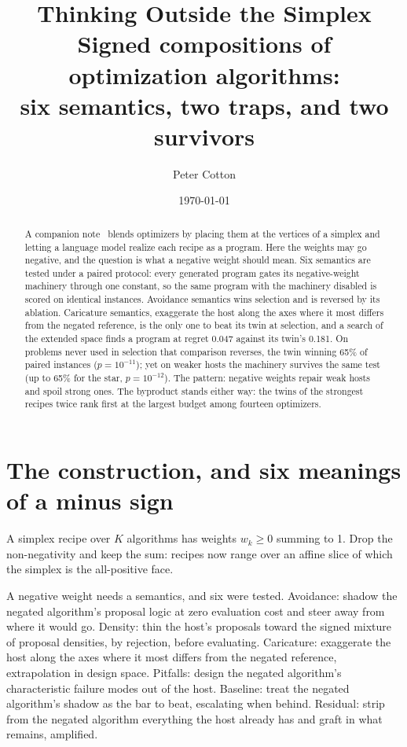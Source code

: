 \documentclass[11pt]{article}
\title{Thinking Outside the Simplex\\[0.4em]
\large Signed compositions of optimization algorithms:\\
six semantics, two traps, and two survivors}
\author{Peter Cotton}
\date{\today}
\begin{document}
\maketitle

\begin{abstract}
\noindent A companion note~\cite{alloy2026} blends optimizers by placing
them at the vertices of a simplex and letting a language model realize each
recipe as a program. Here the weights may go negative, and the question is
what a negative weight should mean. Six semantics are tested under a paired
protocol: every generated program gates its negative-weight machinery
through one constant, so the same program with the machinery disabled is
scored on identical instances. Avoidance semantics wins selection and is
reversed by its ablation. Caricature semantics, exaggerate the host along
the axes where it most differs from the negated reference, is the only one
to beat its twin at selection, and a search of the extended space finds a
program at regret 0.047 against its twin's 0.181. On problems never used in
selection that comparison reverses, the twin winning 65\% of paired
instances ($p = 10^{-11}$); yet on weaker hosts the machinery survives the
same test (up to 65\% for the star, $p = 10^{-12}$). The pattern: negative
weights repair weak hosts and spoil strong ones. The byproduct stands
either way: the twins of the strongest recipes twice rank first at the
largest budget among fourteen optimizers.
\end{abstract}

\section{The construction, and six meanings of a minus sign}

A simplex recipe over $K$ algorithms has weights $w_k \ge 0$ summing to 1.
Drop the non-negativity and keep the sum: recipes now range over an affine
slice of which the simplex is the all-positive face.

A negative weight needs a semantics, and six were tested. Avoidance: shadow
the negated algorithm's proposal logic at zero evaluation cost and steer
away from where it would go. Density: thin the host's proposals toward the
signed mixture of proposal densities, by rejection, before evaluating.
Caricature: exaggerate the host along the axes where it most differs from
the negated reference, extrapolation in design space. Pitfalls: design the
negated algorithm's characteristic failure modes out of the host. Baseline:
treat the negated algorithm's shadow as the bar to beat, escalating when
behind. Residual: strip from the negated algorithm everything the host
already has and graft in what remains, amplified.
\end{document}
